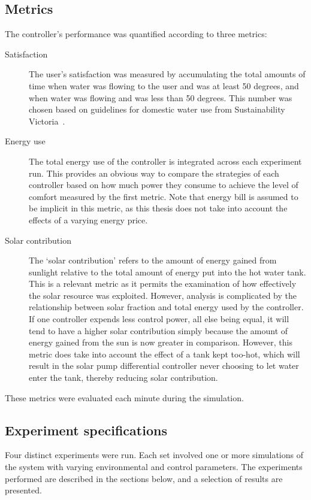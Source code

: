 \subsection{Metrics}

The controller's performance was quantified according to three metrics:

\begin{description}
	\item[Satisfaction]
		The user's satisfaction was measured by accumulating the total amounts of time when water was flowing to the user and was at least 50 degrees, and when water was flowing and was less than 50 degrees.
		This number was chosen based on guidelines for domestic water use from Sustainability Victoria~\cite{LSTS}.
	\item[Energy use]
		The total energy use of the controller is integrated across each experiment run.
		This provides an obvious way to compare the strategies of each controller based on how much power they consume to achieve the level of comfort measured by the first metric.
		Note that energy bill is assumed to be implicit in this metric, as this thesis does not take into account the effects of a varying energy price.
	\item[Solar contribution]
		The `solar contribution' refers to the amount of energy gained from sunlight relative to the total amount of energy put into the hot water tank.
		This is a relevant metric as it permits the examination of how effectively the solar resource was exploited.
		However, analysis is complicated by the relationship between solar fraction and total energy used by the controller.
		If one controller expends less control power, all else being equal, it will tend to have a higher solar contribution simply because the amount of energy gained from the sun is now greater in comparison.
		However, this metric does take into account the effect of a tank kept too-hot, which will result in the solar pump differential controller never choosing to let water enter the tank, thereby reducing solar contribution.
\end{description}

These metrics were evaluated each minute during the simulation.

\subsection{Experiment specifications}

Four distinct experiments were run.
Each set involved one or more simulations of the system with varying environmental and control parameters.
The experiments performed are described in the sections below, and a selection of results are presented.

